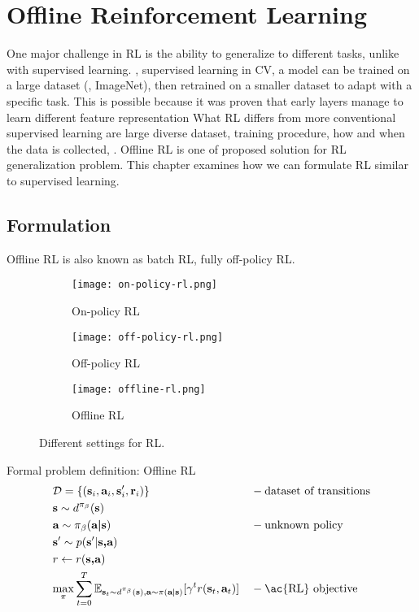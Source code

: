 \chapter{Offline Reinforcement Learning}
One major challenge in \ac{RL} is the ability to generalize to different tasks, unlike with supervised learning. \Eg, supervised learning in \ac{CV}, a model can be trained on a large dataset (\eg, ImageNet), then retrained on a smaller dataset to adapt with a specific task. This is possible because it was proven that early layers manage to learn different feature representation What \ac{RL} differs from more conventional supervised learning are large diverse dataset, training procedure, how and when the data is collected, \etc. Offline \ac{RL} is one of proposed solution for \ac{RL} generalization problem. This chapter examines how we can formulate \ac{RL} similar to supervised learning.

\section{Formulation}
Offline \ac{RL} is also known as batch \ac{RL}, fully off-policy \ac{RL}.
\begin{figure}[hbt!]
	\centering
	\begin{subfigure}[b]{0.25\textwidth}
		\centering
		\texttt{[image: on-policy-rl.png]}
		\caption{On-policy \ac{RL}}
	\end{subfigure}
	\hfill
	\begin{subfigure}[b]{0.25\textwidth}
		\centering
		\texttt{[image: off-policy-rl.png]}
		\caption{Off-policy \ac{RL}}
	\end{subfigure}
	\hfill
	\begin{subfigure}[b]{0.4\textwidth}
		\centering
		\texttt{[image: offline-rl.png]}
		\caption{Offline \ac{RL}}
	\end{subfigure}
	\caption{Different settings for \ac{RL}.}
\end{figure}

Formal problem definition: Offline \ac{RL}
\begin{align}
	&\mathcal{D} = \{ (\textbf{s}_i, \textbf{a}_i, \textbf{s}'_i, \textbf{r}_i) \} &&-\text{dataset of transitions}\\
	&\textbf{s} \sim d^{\pi_\beta}(\textbf{s})\\
	&\textbf{a} \sim \pi_\beta(\textbf{a|s}) &&-\text{unknown policy}\\
	&\textbf{s}' \sim p(\textbf{s}'|\textbf{s,a})\\
	&r \leftarrow r(\textbf{s,a})\\
	&\underset{\pi}{\max} \sum_{t=0}^T \mathbb{E}_{\textbf{s}_t \sim d^{\pi_\beta}(\textbf{s}), \textbf{a} \sim \pi(\textbf{a|s})} [\gamma^t r(\textbf{s}_t, \textbf{a}_t)] &&-\text{\ac{RL} objective}
\end{align}

